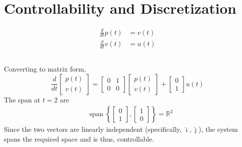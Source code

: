 \documentclass[]{article}
\newcommand{\unit}[1]{\bm{\hat{#1}}}
\newcommand{\diff}[1]{\frac{d}{d #1}}
\newcommand{\Span}{\operatorname{span}}
\begin{document}
\section{Controllability and Discretization}

\begin{align}
	\diff{t} p(t) &= v(t) \\
	\diff{t} v(t) &= u(t)
\end{align}

\subsection{}

Converting to matrix form,
\begin{equation}
	\diff{t} \begin{bmatrix}
	p(t) \\
	v(t)
	\end{bmatrix}
	=
	\begin{bmatrix}
	0 & 1 \\
	0 & 0
	\end{bmatrix}
	\begin{bmatrix}
	p(t) \\
	v(t)
	\end{bmatrix}
	+
	\begin{bmatrix}
	0 \\
	1
	\end{bmatrix} u(t)
\end{equation}
The span at \(t = 2\) are
\begin{align}
	&\Span\left\{
	\begin{bmatrix}
	0 \\
	1
	\end{bmatrix},
	\begin{bmatrix}
	1 \\
	0
	\end{bmatrix}
	\right\} = \mathbb{R}^2
\end{align}
Since the two vectors are linearly independent (specifically, \(\unit{\imath}, \unit{\jmath}\)), the system spans the required space and is thus, controllable.

\subsection{}
\end{document}
